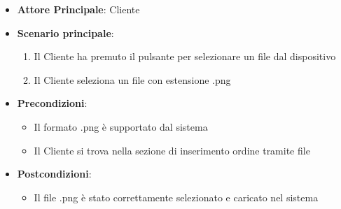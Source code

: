 \label{uc_11.2.3}

\begin{itemize}
    \item \textbf{Attore Principale}: Cliente
    \item \textbf{Scenario principale}:
        \begin{enumerate}
            \item Il Cliente ha premuto il pulsante per selezionare un file dal dispositivo
            \item Il Cliente seleziona un file con estensione .png
        \end{enumerate}
    \item \textbf{Precondizioni}:
        \begin{itemize}
            \item Il formato .png è supportato dal sistema
            \item Il Cliente si trova nella sezione di inserimento ordine tramite file
        \end{itemize}
    \item \textbf{Postcondizioni}: 
        \begin{itemize}
            \item Il file .png è stato correttamente selezionato e caricato nel sistema
        \end{itemize}
\end{itemize}